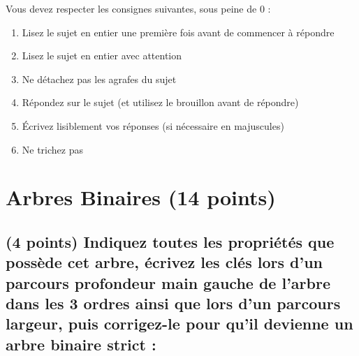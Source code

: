 \documentclass[11pt,a4paper]{article}
\begin{document}
\MakeExamTitle                   %


\bigskip

\noindent Vous devez respecter les consignes suivantes, sous peine de 0 :

\begin{enumerate}[label=\Roman*)]
\item Lisez le sujet en entier une première fois avant de commencer à répondre
\item Lisez le sujet en entier avec attention
\item Ne détachez pas les agrafes du sujet
\item Répondez sur le sujet (et utilisez le brouillon avant de répondre)
\item \'Ecrivez lisiblement vos réponses (si nécessaire en majuscules)
\item Ne trichez pas
\end{enumerate}


\vfillFirst

\section{Arbres Binaires (14 points)}

\subsection{(4 points) Indiquez toutes les propriétés que possède cet arbre, écrivez les clés lors d'un parcours profondeur main gauche de l'arbre dans les 3 ordres ainsi que lors d'un parcours largeur, puis corrigez-le pour qu'il devienne un arbre binaire strict : }
\end{document}
